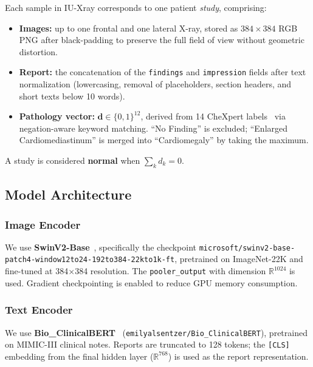 \documentclass[11pt, a4paper]{article}
\newcommand{\vv}[1]{\mathbf{#1}}
\begin{document}
Each sample in IU-Xray corresponds to one patient \emph{study}, comprising:
\begin{itemize}[leftmargin=1.5em]
  \item \textbf{Images:} up to one frontal and one lateral X-ray, stored as
    $384\times384$ RGB PNG after black-padding to preserve the full field of
    view without geometric distortion.
  \item \textbf{Report:} the concatenation of the \texttt{findings} and
    \texttt{impression} fields after text normalization (lowercasing, removal
    of placeholders, section headers, and short texts below 10 words).
  \item \textbf{Pathology vector:}
    $\vv{d}\in\{0,1\}^{12}$, derived from 14 CheXpert
    labels~\citep{irvin2019chexpert} via negation-aware keyword matching.
    ``No Finding'' is excluded; ``Enlarged Cardiomediastinum'' is merged into
    ``Cardiomegaly'' by taking the maximum.
\end{itemize}

A study is considered \textbf{normal} when $\sum_k d_k = 0$.

\subsection{Model Architecture}

\subsubsection{Image Encoder}

We use \textbf{SwinV2-Base}~\citep{liu2022swin},
specifically the checkpoint
\texttt{microsoft/swinv2-base-patch4-window12to24-192to384-22kto1k-ft},
pretrained on ImageNet-22K and fine-tuned at 384$\times$384 resolution.
The \texttt{pooler\_output} with dimension $\mathbb{R}^{1024}$ is used.
Gradient checkpointing is enabled to reduce GPU memory consumption.

\subsubsection{Text Encoder}

We use \textbf{Bio\_ClinicalBERT}~\citep{alsentzer2019publicly}
(\texttt{emilyalsentzer/Bio\_ClinicalBERT}), pretrained on MIMIC-III clinical
notes.
Reports are truncated to 128 tokens; the \texttt{[CLS]} embedding from the
final hidden layer ($\mathbb{R}^{768}$) is used as the report representation.
\end{document}
